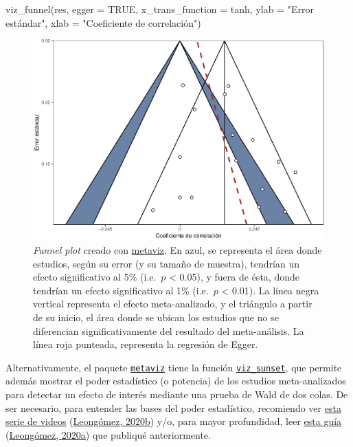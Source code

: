 \documentclass[
  bookmarksnumbered]{article}
\newenvironment{Shaded}{\begin{snugshade}}{\end{snugshade}}
\newcommand{\AttributeTok}[1]{\textcolor[rgb]{0.00,0.34,0.68}{#1}}
\newcommand{\ConstantTok}[1]{\textcolor[rgb]{0.67,0.33,0.00}{#1}}
\newcommand{\FunctionTok}[1]{\textcolor[rgb]{0.39,0.29,0.61}{#1}}
\newcommand{\NormalTok}[1]{\textcolor[rgb]{0.12,0.11,0.11}{#1}}
\newcommand{\StringTok}[1]{\textcolor[rgb]{0.75,0.01,0.01}{#1}}
\begin{document}
\begin{Shaded}
\begin{Highlighting}[]
\FunctionTok{viz\_funnel}\NormalTok{(res, }
           \AttributeTok{egger =} \ConstantTok{TRUE}\NormalTok{,}
           \AttributeTok{x\_trans\_function =}\NormalTok{ tanh,}
           \AttributeTok{ylab =} \StringTok{"Error estándar"}\NormalTok{,}
           \AttributeTok{xlab =} \StringTok{"Coeficiente de correlación"}\NormalTok{)}
\end{Highlighting}
\end{Shaded}

\begin{figure}
\centering
\includegraphics{Meta-analysis_files/figure-latex/funnel-plot2-1.pdf}
\caption{\label{fig:funnel-plot2}\emph{Funnel plot} creado con \href{https://cran.r-project.org/web/packages/metaviz/vignettes/metaviz.html}{metaviz}. En azul, se representa el área donde estudios, según su error (y su tamaño de muestra), tendrían un efecto significativo al 5\% (i.e.~\(p\) \textless{} 0.05), y fuera de ésta, donde tendrían un efecto significativo al 1\% (i.e.~\(p\) \textless{} 0.01). La línea negra vertical representa el efecto meta-analizado, y el triángulo a partir de su inicio, el área donde se ubican los estudios que no se diferencian significativamente del resultado del meta-análisis. La línea roja punteada, representa la regresión de Egger.}
\end{figure}

Alternativamente, el paquete \href{https://cran.r-project.org/web/packages/metaviz/vignettes/metaviz.html}{\texttt{metaviz}} tiene la función \href{https://cran.r-project.org/web/packages/metaviz/vignettes/metaviz.html\#sunset-power-enhanced-funnel-plots}{\texttt{viz\_sunset}}, que permite además mostrar el poder estadístico (o potencia) de los estudios meta-analizados para detectar un efecto de interés mediante una prueba de Wald de dos colas. De ser necesario, para entender las bases del poder estadístico, recomiendo ver \href{https://youtube.com/playlist?list\%20=\%20PLHk7UNt35ccVdyHqnQ6oXVYA6JBNFrE1x}{esta serie de videos} (\protect\hyperlink{ref-leongomezPoderRvid2020}{Leongómez, 2020b}) y/o, para mayor profundidad, leer \href{https://doi.org/10.5281/zenodo.3988776}{esta guía} (\protect\hyperlink{ref-leongomezAnalisisPoderEstadistico2020}{Leongómez, 2020a}) que publiqué anteriormente.
\end{document}
